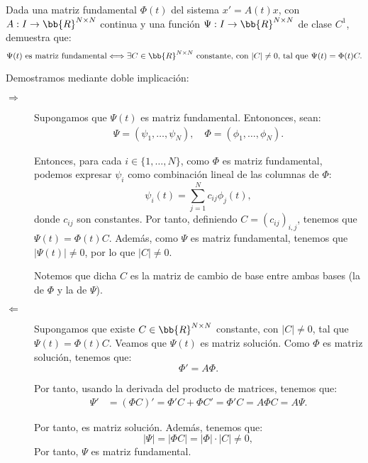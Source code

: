 \begin{ejercicio}\label{ej:5.7}
    Dada una matriz fundamental $\Phi(t)$ del sistema $x' = A(t)x$, con $A : I \to \bb{R}^{N\times N}$ continua y una función $\Psi : I \to \bb{R}^{N\times N}$ de clase $C^1$, demuestra que:
    \[
        \Psi(t) \text{ es matriz fundamental} \Longleftrightarrow \exists C \in \bb{R}^{N\times N} \text{ constante, con } |C|\neq 0 \text{, tal que } \Psi(t) = \Phi(t)C.
    \]

    Demostramos mediante doble implicación:
    \begin{description}
        \item[$\Longrightarrow$] Supongamos que $\Psi(t)$ es matriz fundamental. Entononces, sean:
        \begin{align*}
            \Psi=(\psi_1, \ldots, \psi_N),\quad \Phi=(\phi_1, \ldots, \phi_N).
        \end{align*}

        Entonces, para cada $i\in \{1, \ldots, N\}$, como $\Phi$ es matriz fundamental, podemos expresar $\psi_i$ como combinación lineal de las columnas de $\Phi$:
        \begin{equation*}
            \psi_i(t) = \sum_{j=1}^N c_{ij}\phi_j(t),
        \end{equation*}
        donde $c_{ij}$ son constantes. Por tanto, definiendo $C=(c_{ij})_{i,j}$, tenemos que $\Psi(t)=\Phi(t)C$. Además, como $\Psi$ es matriz fundamental, tenemos que $|\Psi(t)|\neq 0$, por lo que $|C|\neq 0$.

        Notemos que dicha $C$ es la matriz de cambio de base entre ambas bases (la de $\Phi$ y la de $\Psi$).

        \item[$\Longleftarrow$] Supongamos que existe $C\in \bb{R}^{N\times N}$ constante, con $|C|\neq 0$, tal que $\Psi(t)=\Phi(t)C$. Veamos que $\Psi(t)$ es matriz solución. Como $\Phi$ es matriz solución, tenemos que:
        \begin{equation*}
            \Phi' = A\Phi.
        \end{equation*}

        Por tanto, usando la derivada del producto de matrices, tenemos que:
        \begin{align*}
            \Psi' &= (\Phi C)' = \Phi'C + \Phi C' = \Phi'C = A\Phi C = A\Psi.
        \end{align*}

        Por tanto, es matriz solución. Además, tenemos que:
        \begin{equation*}
            |\Psi| = |\Phi C| = |\Phi|\cdot |C|\neq 0,
        \end{equation*}
        Por tanto, $\Psi$ es matriz fundamental.
    \end{description}
\end{ejercicio}

